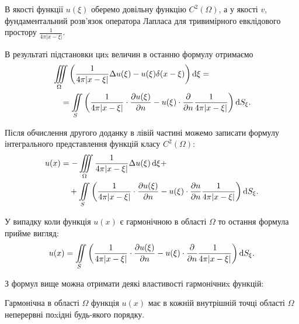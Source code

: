 В якості функції $u(\xi)$ оберемо довільну функцію $C^2(\Omega)$, а у якості $v$, фундаментальний розв'язок оператора Лапласа для тривимірного евклідового простору $\frac{1}{4 \pi \vert x - \xi \vert}$.

В результаті підстановки циx величин в останню формулу отримаємо
\begin{equation}
	\label{eq:4.5.4}
	\begin{aligned}
		& \displaystyle\iiint\limits_\Omega \left( \frac{1}{4 \pi |x - \xi|} \Delta u(\xi) - u(\xi) \delta (x - \xi) \right) \mathop{}\!\mathrm{d} \xi = \\
		& \quad = \displaystyle\iint\limits_S \left( \frac{1}{4 \pi |x - \xi|} \cdot \frac{\partial u(\xi)}{\partial n} - u(\xi) \cdot \frac{\partial}{\partial n} \frac{1}{4 \pi |x - \xi|} \right) \mathop{}\!\mathrm{d} S_\xi.
	\end{aligned}
\end{equation}

Після обчислення другого доданку в лівій частині можемо записати формулу інтегрального представлення функцій класу $C^2(\Omega)$:
\begin{equation}
	\label{eq:4.5.5}
	\begin{aligned}
		u(x) &= - \displaystyle\iiint\limits_\Omega \frac{1}{4 \pi |x - \xi|} \Delta u(\xi) \mathop{}\!\mathrm{d} \xi + \\
		&\quad + \displaystyle\iint\limits_S \left( \frac{1}{4 \pi |x - \xi|} \cdot \frac{\partial u(\xi)}{\partial n} - u(\xi) \cdot \frac{\partial n}{\partial n} \frac{1}{4 \pi |x - \xi|} \right) \mathop{}\!\mathrm{d} S_\xi.
	\end{aligned}
\end{equation}

У випадку коли функція $u(x)$ є гармонічною в області $\Omega$ то остання формула прийме вигляд:
\begin{equation}
	\label{eq:4.5.6}
	u(x) = \displaystyle\iint\limits_S \left( \frac{1}{4 \pi |x - \xi|} \cdot \frac{\partial u(\xi)}{\partial n} - u(\xi) \cdot \frac{\partial}{\partial n} \frac{1}{4 \pi |x - \xi|} \right) \mathop{}\!\mathrm{d} S_\xi.
\end{equation}

З формул вище можна отримати деякі властивості гармонічниx функцій:

\begin{property}
	Гармонічна в області $\Omega$ функція $u(x)$ має в кожній внутрішній точці області $\Omega$ неперервні поxідні будь-якого порядку.
\end{property}

